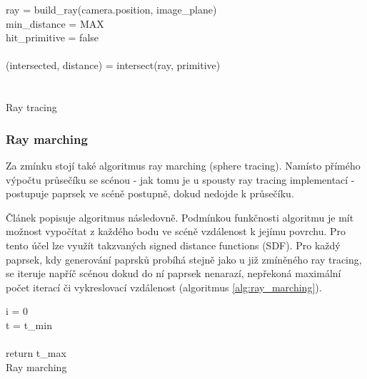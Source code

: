 \begin{center}
	\begin{czechalgorithm}[H] \label{alg:rt_1}
		ray = build\_ray(camera.position, image\_plane)\\
		min\_distance = MAX\\
		hit\_primitive = false\\
		 {\\
			(intersected, distance) = intersect(ray, primitive)\\
			\\
		}\\
		\caption{Ray tracing}
	\end{czechalgorithm}
\end{center}

\subsubsection{Ray marching}
Za zmínku stojí také algoritmus ray marching (sphere tracing). Namísto přímého výpočtu průsečíku se scénou - jak tomu je u spousty ray tracing implementací - postupuje paprsek ve scéně postupně, dokud nedojde k průsečíku.

Článek \cite{sphere_tracing} popisuje algoritmus následovně. Podmínkou funkčnosti algoritmu je mít možnost vypočítat z každého bodu ve scéně vzdálenost k jejímu povrchu. Pro tento účel lze využít takzvaných signed distance functions (SDF). Pro každý paprsek, kdy generování paprsků probíhá stejně jako u již zmíněného ray tracing, se iteruje napříč scénou dokud do ní paprsek nenarazí, nepřekoná maximální počet iterací či vykreslovací vzdálenost (algoritmus \ref{alg:ray_marching}).


\begin{center}
	\begin{czechalgorithm}[H] \label{alg:ray_marching}
		i = 0\\
		t = t\_min\\
		\\
		return t\_max\\
		\caption{Ray marching}
	\end{czechalgorithm}
\end{center}

